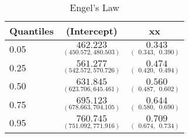 %

\begin{table}[hptb]
\caption{Engel's Law\label{fit2}}
\begin{center}
\begin{tabular}{|l||c|c|} \hline
\multicolumn{1}{|l||}{Quantiles}&\multicolumn{1}{c|}{(Intercept)}&\multicolumn{1}{c|}{xx}\\ \hline
0.05&$\underset{(450.572,480.503)}{462.223}$&$\underset{(~~0.343,~~0.390)}{~~0.343}$\\ 
0.25&$\underset{(542.572,570.726)}{561.277}$&$\underset{(~~0.420,~~0.494)}{~~0.474}$\\ 
0.50&$\underset{(623.706,645.461)}{631.845}$&$\underset{(~~0.487,~~0.602)}{~~0.560}$\\ 
0.75&$\underset{(678.663,704.105)}{695.123}$&$\underset{(~~0.580,~~0.690)}{~~0.644}$\\ 
0.95&$\underset{(751.092,771.916)}{760.745}$&$\underset{(~~0.674,~~0.734)}{~~0.709}$\\ 
\hline
\end{tabular}
\vspace{3mm}
\end{center}
\end{table}
